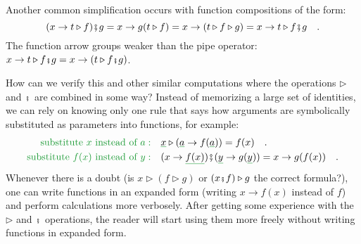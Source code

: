Another common simplification occurs with function compositions of
the form:
\[
(x\rightarrow t\triangleright f)\bef g=x\rightarrow g(t\triangleright f)=x\rightarrow(t\triangleright f\triangleright g)=x\rightarrow t\triangleright f\bef g\quad.
\]
The function arrow groups weaker than the pipe operator: $x\rightarrow t\triangleright f\bef g=x\rightarrow(t\triangleright f\bef g)$.

How can we verify this and other similar computations where the operations
$\triangleright$ and $\bef$ are combined in some way? Instead of
memorizing a large set of identities, we can rely on knowing only
one rule that says how arguments are symbolically substituted as parameters
into functions, for example:
\begin{align*}
{\color{greenunder}\text{substitute }x\text{ instead of }a:}\quad & \gunderline x\triangleright(\gunderline a\rightarrow f(\gunderline a))=f(x)\quad.\\
{\color{greenunder}\text{substitute }f(x)\text{ instead of }y:}\quad & (x\rightarrow\gunderline{f(x)})\bef(\gunderline y\rightarrow g(\gunderline y))=x\rightarrow g(f(x))\quad.
\end{align*}
Whenever there is a doubt (is $x\triangleright(f\triangleright g)$
or $(x\bef f)\triangleright g$ the correct formula?), one can write
functions in an expanded form (writing $x\rightarrow f(x)$ instead
of $f$) and perform calculations more verbosely. After getting some
experience with the $\triangleright$ and $\bef$ operations, the
reader will start using them more freely without writing functions
in expanded form.

